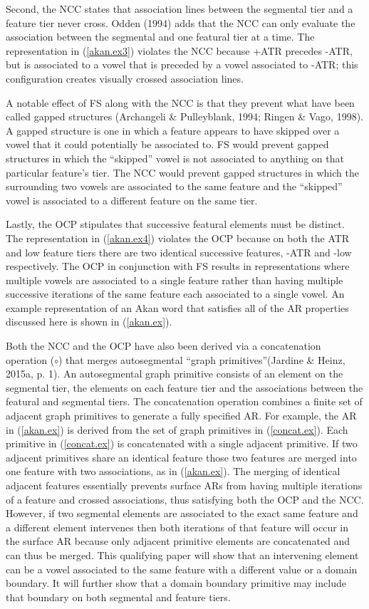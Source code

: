 \documentclass[,doc,floatsintext]{apa6}
\theoremstyle{definition}
\theoremstyle{definition}
\theoremstyle{definition}
\theoremstyle{remark}
\begin{document}
Second, the NCC states that association lines between the segmental tier
and a feature tier never cross. Odden (1994) adds that the NCC can only
evaluate the association between the segmental and one featural tier at
a time. The representation in (\ref{akan.ex3}) violates the NCC because
+ATR precedes -ATR, but is associated to a vowel that is preceded by a
vowel associated to -ATR; this configuration creates visually crossed
association lines.

A notable effect of FS along with the NCC is that they prevent what have
been called gapped structures (Archangeli \& Pulleyblank, 1994; Ringen
\& Vago, 1998). A gapped structure is one in which a feature appears to
have skipped over a vowel that it could potentially be associated to. FS
would prevent gapped structures in which the \enquote{skipped} vowel is
not associated to anything on that particular feature's tier. The NCC
would prevent gapped structures in which the surrounding two vowels are
associated to the same feature and the \enquote{skipped} vowel is
associated to a different feature on the same tier.

Lastly, the OCP stipulates that successive featural elements must be
distinct. The representation in (\ref{akan.ex4}) violates the OCP
because on both the ATR and low feature tiers there are two identical
successive features, -ATR and -low respectively. The OCP in conjunction
with FS results in representations where multiple vowels are associated
to a single feature rather than having multiple successive iterations of
the same feature each associated to a single vowel. An example
representation of an Akan word that satisfies all of the AR properties
discussed here is shown in (\ref{akan.ex}).

Both the NCC and the OCP have also been derived via a concatenation
operation (\(\circ\)) that merges autosegmental \enquote{graph
primitives}(Jardine \& Heinz, 2015a, p. 1). An autosegmental graph
primitive consists of an element on the segmental tier, the elements on
each feature tier and the associations between the featural and
segmental tiers. The concatenation operation combines a finite set of
adjacent graph primitives to generate a fully specified AR. For example,
the AR in (\ref{akan.ex}) is derived from the set of graph primitives in
(\ref{concat.ex}). Each primitive in (\ref{concat.ex}) is concatenated
with a single adjacent primitive. If two adjacent primitives share an
identical feature those two features are merged into one feature with
two associations, as in (\ref{akan.ex}). The merging of identical
adjacent features essentially prevents surface ARs from having multiple
iterations of a feature and crossed associations, thus satisfying both
the OCP and the NCC. However, if two segmental elements are associated
to the exact same feature and a different element intervenes then both
iterations of that feature will occur in the surface AR because only
adjacent primitive elements are concatenated and can thus be merged.
This qualifying paper will show that an intervening element can be a
vowel associated to the same feature with a different value or a domain
boundary. It will further show that a domain boundary primitive may
include that boundary on both segmental and feature tiers.
\end{document}
